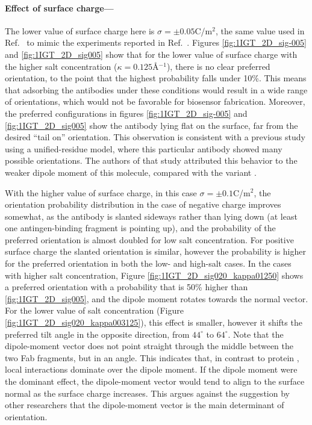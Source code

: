  \medskip
 
 \paragraph*{Effect of surface charge---}
 
The lower value of surface charge here is $\sigma=\pm 0.05$C/m$^2$, the same value used in Ref.~ to mimic the experiments reported in Ref.~. 
Figures \ref{fig:1IGT_2D_sig-005} and \ref{fig:1IGT_2D_sig005} show that for the lower value of surface charge with the higher salt concentration ($\kappa=0.125$\AA$^{-1}$), there is no clear preferred orientation, to the point that the highest probability falls under 10\%. 
This means that adsorbing the antibodies under these conditions would result in a wide range of orientations, which would not be favorable for biosensor fabrication.
Moreover, the preferred configurations in figures \ref{fig:1IGT_2D_sig-005} and \ref{fig:1IGT_2D_sig005} show the antibody lying flat on the surface, far from the desired ``tail on'' orientation. 
This observation is consistent with a previous study using a unified-residue model,\cite{ZhouChenJiang2003} where this particular antibody showed many possible orientations. 
The authors of that study attributed this behavior to the weaker dipole moment of this molecule, compared with the variant .
 
With the higher value of surface charge, in this case $\sigma=\pm0.1$C/m$^2$, the orientation probability distribution in the case of negative charge improves somewhat, as the antibody is slanted sideways rather than lying down (at least one antingen-binding fragment is pointing up), and the probability of the preferred orientation is almost doubled for low salt concentration.
For positive surface charge the slanted orientation is similar, however the probability is higher for the preferred orientation in both the low- and high-salt cases.
In the cases with higher salt concentration, Figure \ref{fig:1IGT_2D_sig020_kappa01250} shows a preferred orientation with a probability that is 50\% higher than \ref{fig:1IGT_2D_sig005}, and the dipole moment rotates towards the normal vector. 
For the lower value of salt concentration (Figure \ref{fig:1IGT_2D_sig020_kappa003125}), this effect is smaller, however it shifts the preferred tilt angle in the opposite direction, from $44^{\circ}$ to $64^{\circ}$. Note that the dipole-moment vector does not point straight through the middle between the two Fab fragments, but in an angle.
This indicates that, in contrast to protein \gb, local interactions dominate over the dipole moment. If the dipole moment were the dominant effect, the dipole-moment vector would tend to align to the surface normal as the surface charge increases.
This argues against the suggestion by other researchers\cite{ChenLiuZhouJiang2003,ZhouChenJiang2003} that the dipole-moment vector is the main determinant of orientation.
 
